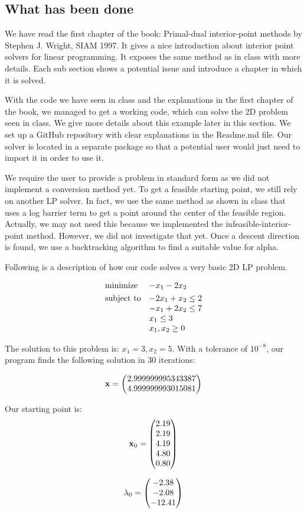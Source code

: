 \subsection{What has been done}\label{section:done}

We have read the first chapter of the book: Primal-dual interior-point methods by Stephen J. Wright, SIAM 1997. It gives a nice introduction about interior point solvers for linear programming. It exposes the same method as in class with more details. Each sub section shows a potential issue and introduce a chapter in which it is solved.

With the code we have seen in class and the explanations in the first chapter of the book, we managed to get a working code, which can solve the 2D problem seen in class. We give more details about this example later in this section. We set up a GitHub repository with clear explanations in the Readme.md file. Our solver is located in a separate package so that a potential user would just need to import it in order to use it.

We require the user to provide a problem in standard form as we did not implement a conversion method yet. To get a feasible starting point, we still rely on another LP solver. In fact, we use the same method as shown in class that uses a log barrier term to get a point around the center of the feasible region. Actually, we may not need this because we implemented the infeasible-interior-point method. However, we did not investigate that yet. Once a descent direction is found, we use a backtracking algorithm to find a suitable value for alpha. 

Following is a description of how our code solves a very basic 2D LP problem.

\[
	\begin{array}{ll} \displaystyle \operatorname*{minimize}_{} & {-x_1 - 2 x_2} \\ \operatorname{subject\ to} & {-2 x_1 + x_2 \leq 2} \\ & {-x_1 + 2 x_2 \leq 7} \\ & {x_1 \leq 3} \\ & {x_1, x_2 \geq 0} \end{array}
\]

The solution to this problem is: $x_1 = 3, x_2 = 5$. With a tolerance of $10^{-8}$, our program finds the following solution in 30 iterations:

\[
	\boldsymbol{\mathrm{x}} = \begin{pmatrix} 2.999999995343387 \\ 4.999999993015081 \end{pmatrix}
\]

Our starting point is:
\[
	\boldsymbol{\mathrm{x}}_0 = \begin{pmatrix} 2.19 \\
2.19 \\
4.19 \\
4.80 \\
0.80 \end{pmatrix}
\]

\[
\lambda_0 = \begin{pmatrix} -2.38 \\
-2.08 \\
-12.41 \end{pmatrix}
\]

